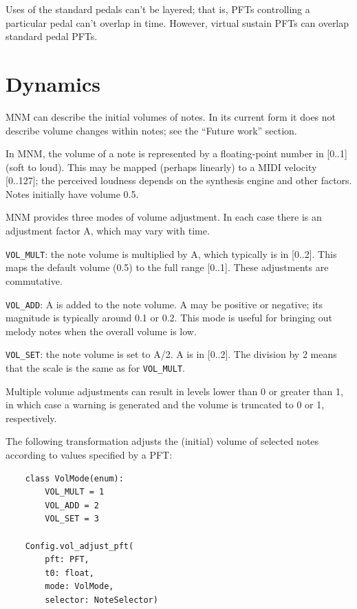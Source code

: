 \documentclass[letterpaper, 12pt]{article}
\begin{document}
Uses of the standard pedals can't be layered;
that is, PFTs controlling a particular pedal can't overlap in time.
However, virtual sustain PFTs can overlap standard pedal PFTs.

\section{Dynamics}

MNM can describe the initial volumes of notes.
In its current form it does not describe volume changes within notes;
see the ``Future work'' section.

In MNM, the volume of a note is represented by a floating-point number
in [0..1] (soft to loud).
This may be mapped (perhaps linearly) to a MIDI velocity [0..127];
the perceived loudness depends on the synthesis engine and other factors.
Notes initially have volume 0.5.

MNM provides three modes of volume adjustment.
In each case there is an adjustment factor A, which may vary with time.

\texttt{VOL\_MULT}: the note volume is multiplied by A,
which typically is in [0..2].
This maps the default volume (0.5) to the full range [0..1].
These adjustments are commutative.

\texttt{VOL\_ADD}: A is added to the note volume.
A may be positive or negative;
its magnitude is typically around 0.1 or 0.2.
This mode is useful for bringing out melody notes
when the overall volume is low.

\texttt{VOL\_SET}: the note volume is set to A/2.
A is in [0..2].
The division by 2 means that the scale is the same as for \texttt{VOL\_MULT}.

Multiple volume adjustments can result in levels lower than 0 or greater than 1,
in which case a warning is generated and the volume is truncated
to 0 or 1, respectively.

The following transformation adjusts the (initial) volume of selected notes
according to values specified by a PFT:

\begin{small}\begin{singlespace}\vspace{-18px}\begin{verbatim}
    class VolMode(enum):
        VOL_MULT = 1
        VOL_ADD = 2
        VOL_SET = 3

    Config.vol_adjust_pft(
        pft: PFT,
        t0: float,
        mode: VolMode,
        selector: NoteSelector)
\end{verbatim}\end{singlespace}\end{small}\vspace{-18px}\noindent
\end{document}
